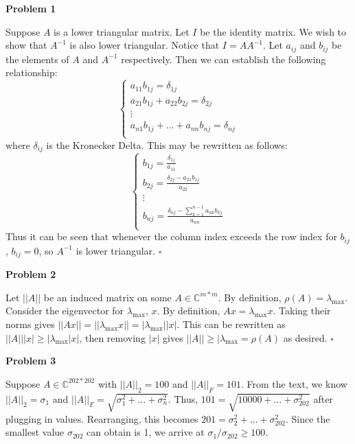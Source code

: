 \documentclass{article}
\def\C{\mathbb{C}}
\newcommand{\Problem}[1]{\textbf{Problem #1}}
\begin{document}
\Problem{1}

Suppose $A$ is a lower triangular matrix. 
Let $I$ be the identity matrix. 
We wish to show that $A^{-1}$ is also lower triangular. 
Notice that $I = AA^{-1}$. 
Let $a_{ij}$ and $b_{ij}$ be the elements of $A$ and $A^{-1}$ respectively. 
Then we can establish the following relationship:
\begin{equation*}
\begin{cases}
    a_{11}b_{1j} = \delta_{1j}\\
    a_{21}b_{1j} + a_{22}b_{2j} = \delta_{2j}\\
    \vdots\\
    a_{n1}b_{1j} + \hdots + a_{nn}b_{nj} = \delta_{nj}\\
\end{cases}
\end{equation*}
where $\delta_{ij}$ is the Kronecker Delta.
This may be rewritten as follows:
\begin{equation*}
\begin{cases}
    b_{1j} = \frac{\delta_{1j}}{a_{11}} \\
    b_{2j} = \frac{\delta_{2j} - a_{21}b_{1j}}{a_{22}} \\
    \vdots \\
    b_{nj} = \frac{\delta_{nj} - \sum_{k=1}^{n-1} a_{nk}b_{kj}}{a_{nn}}\\
\end{cases}
\end{equation*}
Thus it can be seen that whenever the column index exceeds the row index for $b_{ij}$, $b_{ij} = 0$, so $A^{-1}$ is lower triangular. 
$\square$

\Problem{2}

Let $||A||$ be an induced matrix on some $A \in \C^{m*m}$.
By definition, $\rho(A) = \lambda_{\text{max}}$.
Consider the eigenvector for $\lambda_{\text{max}}$, $x$.
By definition, $Ax = \lambda_{\text{max}}x$.
Taking their norms gives $||Ax|| = ||\lambda_{\text{max}}x|| = |\lambda_{\text{max}}||x|$.
This can be rewritten as $||A|| |x| \geq |\lambda_{\text{max}} |x|$, then removing $|x|$ gives $||A|| \geq |\lambda_{\text{max}} = \rho(A)$ as desired.
$\square$

\Problem{3}

Suppose $A \in \C^{202*202}$ with $||A||_2 = 100$ and $||A||_F = 101$.
From the text, we know $||A||_2 = \sigma_1$ and $||A||_F = \sqrt{\sigma_1^2 + \hdots + \sigma_n^2}$.
Thus, $101 = \sqrt{10000 + \hdots + \sigma_{202}^2}$ after plugging in values.
Rearranging, this becomes $201 = \sigma_2^2 + \hdots + \sigma_{202}^2$.
Since the smallest value $\sigma_{202}$ can obtain is 1, we arrive at $\sigma_1/\sigma_{202} \geq 100$. 
\end{document}
